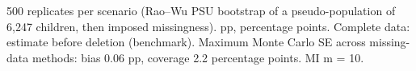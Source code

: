 \begin{minipage}{\linewidth}
\vspace{.05em}
500 replicates per scenario (Rao–Wu PSU bootstrap of a pseudo-population of 6,247 children, then imposed missingness). pp, percentage points. Complete data: estimate before deletion (benchmark). Maximum Monte Carlo SE across missing-data methods: bias 0.06 pp, coverage 2.2 percentage points. MI m = 10.\\
\end{minipage}
\endgroup

